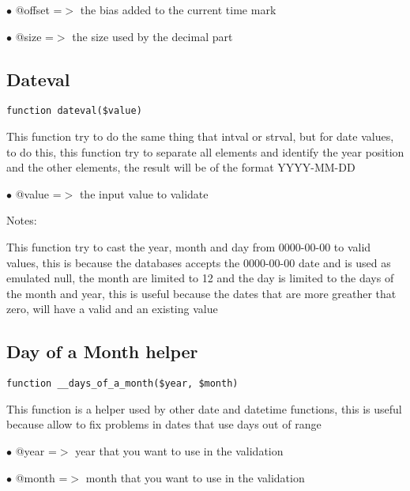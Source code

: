 \documentclass[a4paper]{book}
\begin{document}
\begin{compactitem}
\item[\color{myblue}$\bullet$] @offset =$>$ the bias added to the current time mark
\item[\color{myblue}$\bullet$] @size   =$>$ the size used by the decimal part
\end{compactitem}

\hypertarget{toc74}{}
\subsection{Dateval}

\begin{lstlisting}
function dateval($value)
\end{lstlisting}

This function try to do the same thing that intval or strval, but for date
values, to do this, this function try to separate all elements and identify
the year position and the other elements, the result will be of the format
YYYY-MM-DD

\begin{compactitem}
\item[\color{myblue}$\bullet$] @value =$>$ the input value to validate
\end{compactitem}

Notes:

This function try to cast the year, month and day from 0000-00-00 to valid
values, this is because the databases accepts the 0000-00-00 date and is used
as emulated null, the month are limited to 12 and the day is limited to the
days of the month and year, this is useful because the dates that are more
greather that zero, will have a valid and an existing value

\hypertarget{toc75}{}
\subsection{Day of a Month helper}

\begin{lstlisting}
function __days_of_a_month($year, $month)
\end{lstlisting}

This function is a helper used by other date and datetime functions, this
is useful because allow to fix problems in dates that use days out of range

\begin{compactitem}
\item[\color{myblue}$\bullet$] @year  =$>$ year that you want to use in the validation
\item[\color{myblue}$\bullet$] @month =$>$ month that you want to use in the validation
\end{compactitem}
\end{document}
